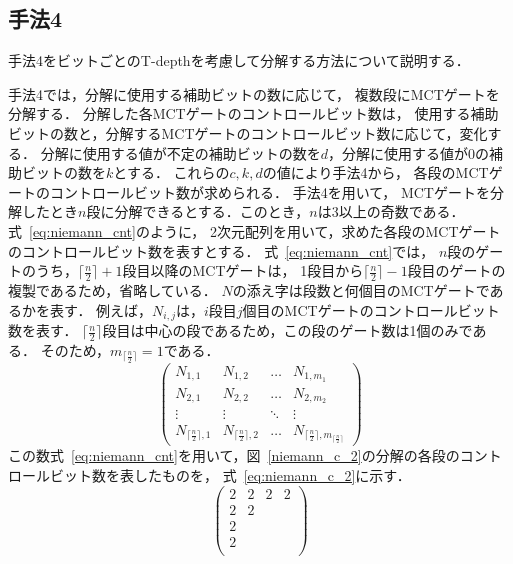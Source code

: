 \subsection{手法4}
手法4をビットごとのT-depthを考慮して分解する方法について説明する．
\par
手法4では，分解に使用する補助ビットの数に応じて，
複数段にMCTゲートを分解する．
分解した各MCTゲートのコントロールビット数は，
使用する補助ビットの数と，分解するMCTゲートのコントロールビット数に応じて，変化する．
分解に使用する値が不定の補助ビットの数を$d$，分解に使用する値が0の補助ビットの数を$k$とする．
これらの$c, k, d$の値により手法4から，
各段のMCTゲートのコントロールビット数が求められる．
手法4を用いて，
MCTゲートを分解したとき$n$段に分解できるとする．このとき，$n$は3以上の奇数である．
式~\ref{eq:niemann_cnt}のように，
2次元配列を用いて，求めた各段のMCTゲートのコントロールビット数を表すとする．
式~\ref{eq:niemann_cnt}では，
$n$段のゲートのうち，$\lceil \frac{n}{2} \rceil+1$段目以降のMCTゲートは，
1段目から$\lceil \frac{n}{2} \rceil -1$段目のゲートの複製であるため，省略している．
$N$の添え字は段数と何個目のMCTゲートであるかを表す．
例えば，$N_{i, j}$は，$i$段目$j$個目のMCTゲートのコントロールビット数を表す．
$\lceil \frac{n}{2} \rceil$段目は中心の段であるため，この段のゲート数は1個のみである．
そのため，$m_{\lceil \frac{n}{2} \rceil}=1$である．
\begin{equation}\label{eq:niemann_cnt}
  \begin{pmatrix}
    N_{1,1} & N_{1,2} & \dots & N_{1,m_{1}} \\
    N_{2,1} & N_{2,2} & \dots & N_{2,m_{2}} \\
    \vdots & \vdots & \ddots & \vdots \\
    N_{\lceil \frac{n}{2} \rceil,1} & N_{\lceil \frac{n}{2} \rceil,2} & \dots & N_{\lceil \frac{n}{2} \rceil,m_{\lceil \frac{n}{2} \rceil}}
  \end{pmatrix}
\end{equation}
この数式~\ref{eq:niemann_cnt}を用いて，図~\ref{niemann_c_2}の分解の各段のコントロールビット数を表したものを，
式~\ref{eq:niemann_c_2}に示す．
\begin{equation}\label{eq:niemann_c_2}
  \begin{pmatrix}
        2 & 2 & 2 & 2 \\
        2 & 2 &   & \\
        2 &   &   & \\
        2 &   &   & \\
  \end{pmatrix}
\end{equation}
